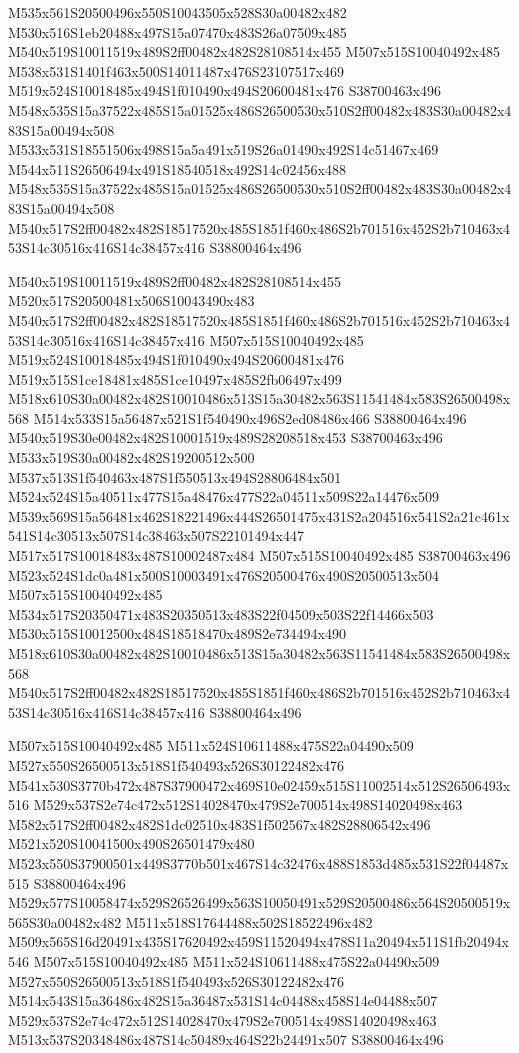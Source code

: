 \documentclass{article}
\begin{document}
\begin{multicols}{2}
M535x561S20500496x550S10043505x528S30a00482x482 M530x516S1eb20488x497S15a07470x483S26a07509x485 M540x519S10011519x489S2ff00482x482S28108514x455 M507x515S10040492x485 M538x531S1401f463x500S14011487x476S23107517x469 M519x524S10018485x494S1f010490x494S20600481x476 S38700463x496 M548x535S15a37522x485S15a01525x486S26500530x510S2ff00482x483S30a00482x483S15a00494x508 M533x531S18551506x498S15a5a491x519S26a01490x492S14c51467x469 M544x511S26506494x491S18540518x492S14c02456x488 M548x535S15a37522x485S15a01525x486S26500530x510S2ff00482x483S30a00482x483S15a00494x508 M540x517S2ff00482x482S18517520x485S1851f460x486S2b701516x452S2b710463x453S14c30516x416S14c38457x416 S38800464x496

M540x519S10011519x489S2ff00482x482S28108514x455 M520x517S20500481x506S10043490x483 M540x517S2ff00482x482S18517520x485S1851f460x486S2b701516x452S2b710463x453S14c30516x416S14c38457x416 M507x515S10040492x485 M519x524S10018485x494S1f010490x494S20600481x476 M519x515S1ce18481x485S1ce10497x485S2fb06497x499 M518x610S30a00482x482S10010486x513S15a30482x563S11541484x583S26500498x568 M514x533S15a56487x521S1f540490x496S2ed08486x466 S38800464x496 M540x519S30e00482x482S10001519x489S28208518x453 S38700463x496 M533x519S30a00482x482S19200512x500 M537x513S1f540463x487S1f550513x494S28806484x501 M524x524S15a40511x477S15a48476x477S22a04511x509S22a14476x509 M539x569S15a56481x462S18221496x444S26501475x431S2a204516x541S2a21c461x541S14c30513x507S14c38463x507S22101494x447 M517x517S10018483x487S10002487x484 M507x515S10040492x485 S38700463x496 M523x524S1dc0a481x500S10003491x476S20500476x490S20500513x504 M507x515S10040492x485 M534x517S20350471x483S20350513x483S22f04509x503S22f14466x503 M530x515S10012500x484S18518470x489S2e734494x490 M518x610S30a00482x482S10010486x513S15a30482x563S11541484x583S26500498x568 M540x517S2ff00482x482S18517520x485S1851f460x486S2b701516x452S2b710463x453S14c30516x416S14c38457x416 S38800464x496

M507x515S10040492x485 M511x524S10611488x475S22a04490x509 M527x550S26500513x518S1f540493x526S30122482x476 M541x530S3770b472x487S37900472x469S10e02459x515S11002514x512S26506493x516 M529x537S2e74c472x512S14028470x479S2e700514x498S14020498x463 M582x517S2ff00482x482S1dc02510x483S1f502567x482S28806542x496 M521x520S10041500x490S26501479x480 M523x550S37900501x449S3770b501x467S14c32476x488S1853d485x531S22f04487x515 S38800464x496 M529x577S10058474x529S26526499x563S10050491x529S20500486x564S20500519x565S30a00482x482 M511x518S17644488x502S18522496x482 M509x565S16d20491x435S17620492x459S11520494x478S11a20494x511S1fb20494x546 M507x515S10040492x485 M511x524S10611488x475S22a04490x509 M527x550S26500513x518S1f540493x526S30122482x476 M514x543S15a36486x482S15a36487x531S14c04488x458S14e04488x507 M529x537S2e74c472x512S14028470x479S2e700514x498S14020498x463 M513x537S20348486x487S14c50489x464S22b24491x507 S38800464x496


\end{multicols}
\end{document}
